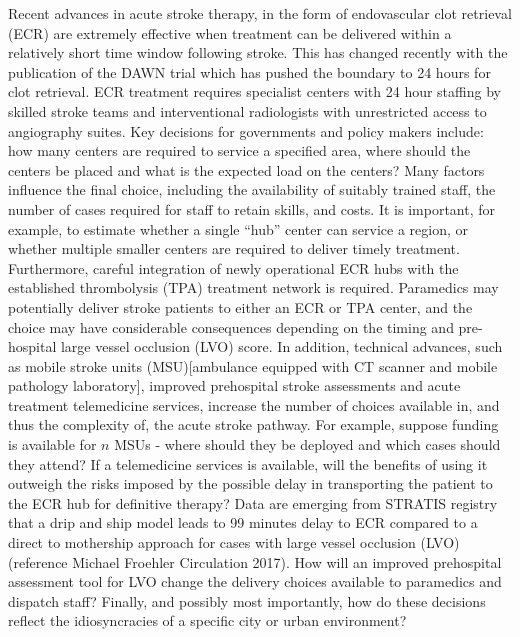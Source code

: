 \documentclass[utf8]{frontiersHLTH}
\begin{document}
Recent advances in acute stroke therapy, in the form of endovascular
clot retrieval
(ECR)\cite{berkhemer2015randomized,goyal2016endovascular,goyal2015randomized,campbell2015endovascular,saver2015stent}
are extremely effective when treatment can be delivered within a
relatively short time window following stroke. This has changed
recently with the publication of the DAWN trial which has pushed the
boundary to 24 hours for clot
retrieval\cite{nogueira2018thrombectomy}. ECR treatment requires
specialist centers with 24 hour staffing by skilled stroke teams and
interventional radiologists with unrestricted access to angiography
suites. Key decisions for governments and policy makers include: how
many centers are required to service a specified area, where should
the centers be placed and what is the expected load on the centers?\cite{Phan_2017}
Many factors influence the final choice, including the availability of
suitably trained staff, the number of cases required for staff to
retain skills, and costs. It is important, for example, to estimate
whether a single ``hub'' center can service a region, or whether
multiple smaller centers are required to deliver timely
treatment. Furthermore, careful integration of newly operational ECR
hubs with the established thrombolysis (TPA)\cite{tnionda1995tissue}
treatment network is required. Paramedics may potentially deliver
stroke patients to either an ECR or TPA center, and the choice may
have considerable consequences depending on the timing and
pre-hospital large vessel occlusion (LVO) score. In addition,
technical advances, such as mobile stroke units (MSU)[ambulance
equipped with CT scanner and mobile pathology laboratory], improved
prehospital stroke assessments and acute treatment telemedicine
services, increase the number of choices available in, and thus the
complexity of, the acute stroke pathway. For example, suppose funding
is available for $n$ MSUs - where should they be deployed and which
cases should they attend? If a telemedicine services is available,
will the benefits of using it outweigh the risks imposed by the
possible delay in transporting the patient to the ECR hub for definitive therapy? Data are emerging from STRATIS registry that a drip and ship model leads to 99 minutes delay to ECR compared to a direct to mothership approach for cases with large vessel occlusion (LVO) (reference Michael Froehler Circulation 2017).   How will an improved prehospital assessment tool for LVO
change the delivery choices available to paramedics and dispatch
staff? Finally, and possibly most importantly, how do these decisions
reflect the idiosyncracies of a specific city or urban environment?
\end{document}
